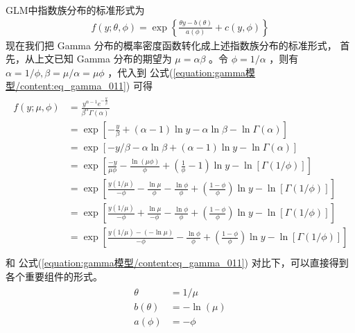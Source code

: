 \documentclass[letterpaper,10pt,english]{sphinxmanual}
\begin{document}
GLM中指数族分布的标准形式为
\begin{equation}\label{equation:gamma模型/content:eq_gamma_012_1}
\begin{split}f(y;\theta,\phi) = \exp \left \{\frac{\theta y - b(\theta)}{a(\phi)} + c(y,\phi) \right \}\end{split}
\end{equation}
现在我们把 Gamma 分布的概率密度函数转化成上述指数族分布的标准形式，
首先，从上文已知 Gamma 分布的期望为 \(\mu=\alpha \beta\)
。令 \(\phi = 1/\alpha\) ，则有 \(\alpha = 1 / \phi ,\beta=\mu / \alpha=\mu \phi\)
，代入到 公式(\ref{equation:gamma模型/content:eq_gamma_011}) 可得
\begin{align}\label{equation:gamma模型/content:eq_gamma_013}\!\begin{aligned}
f(y;\mu,\phi) &=  \frac{ y^{\alpha-1} e^{-\frac{y}{\beta} }}{\beta^{\alpha} \Gamma(\alpha)}\\
&= \exp \left [
    -\frac{y}{\beta} + (\alpha-1) \ln y - \alpha \ln \beta  - \ln \Gamma(\alpha)
\right ]\\
&= \exp \left [
    -y / \beta  - \alpha \ln \beta  + (\alpha-1) \ln y   - \ln \Gamma(\alpha)
\right ]\\
&= \exp \left [
    \frac{-y}{\mu \phi}  - \frac{ \ln (\mu \phi) }{ \phi} + (\frac{1}{\phi}-1) \ln y   - \ln [\Gamma(1 / \phi)]
\right ]\\
&= \exp \left [
    \frac{y(1/\mu)}{-\phi}  - \frac{ \ln \mu }{ \phi} - \frac{ \ln  \phi }{ \phi}  + (\frac{1-\phi}{\phi}) \ln y  - \ln [\Gamma(1 / \phi)]
\right ]\\
&= \exp \left [
    \frac{y(1/\mu)}{-\phi}  + \frac{ \ln \mu }{ -\phi} - \frac{ \ln  \phi }{ \phi}  + (\frac{1-\phi}{\phi}) \ln y   - \ln [\Gamma(1 / \phi)]
\right ]\\
&= \exp \left [
    \frac{y(1/\mu) - (-\ln \mu)}{-\phi}   - \frac{ \ln  \phi }{ \phi}  + (\frac{1-\phi}{\phi}) \ln y   - \ln [\Gamma(1 / \phi)]
\right ]\\
\end{aligned}\end{align}
和 公式(\ref{equation:gamma模型/content:eq_gamma_011}) 对比下，可以直接得到各个重要组件的形式。
\begin{align}\label{equation:gamma模型/content:gamma模型/content:8}\!\begin{aligned}
\theta &= 1/\mu\\
b(\theta) &= -\ln(\mu)\\
a(\phi) &= - \phi\\
\end{aligned}\end{align}
\end{document}
